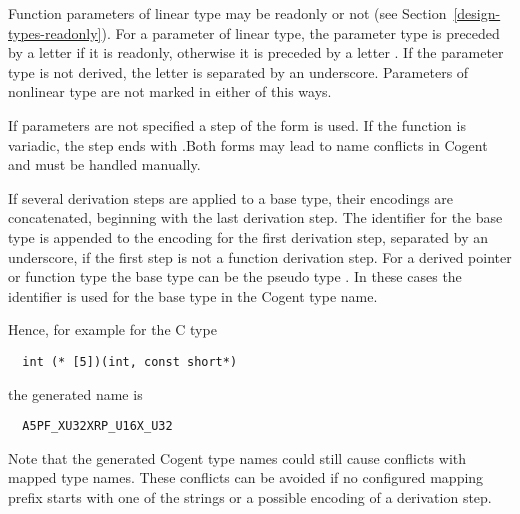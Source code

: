 Function parameters of linear type may be readonly or not (see Section~\ref{design-types-readonly}). For a 
parameter of linear type, the parameter type  is preceded by a letter  if it is readonly,
otherwise it is preceded by a letter . If the parameter type is not derived, the letter is separated
by an underscore. Parameters of nonlinear type are not marked in either of this ways.

If parameters are not specified a step of the form  is used.
If the function is variadic, the step ends with .Both forms
may lead to name conflicts in Cogent and must be handled manually.

If several derivation steps are applied to a base type, their encodings are concatenated, beginning with the 
last derivation step. The identifier for the base type is appended to the encoding for the first derivation step,
separated by an underscore, if the first step is not a function derivation step. For a derived pointer or 
function type the base type can be the pseudo type . In these cases the identifier  is
used for the base type in the Cogent type name.

Hence, for example for the C type
\begin{verbatim}
  int (* [5])(int, const short*)
\end{verbatim}
the generated name is
\begin{verbatim}
  A5PF_XU32XRP_U16X_U32
\end{verbatim}

Note that the generated Cogent type names could still cause conflicts with mapped type names. These conflicts can be
avoided if no configured mapping prefix starts with one of the  strings
or a possible encoding of a derivation step.
